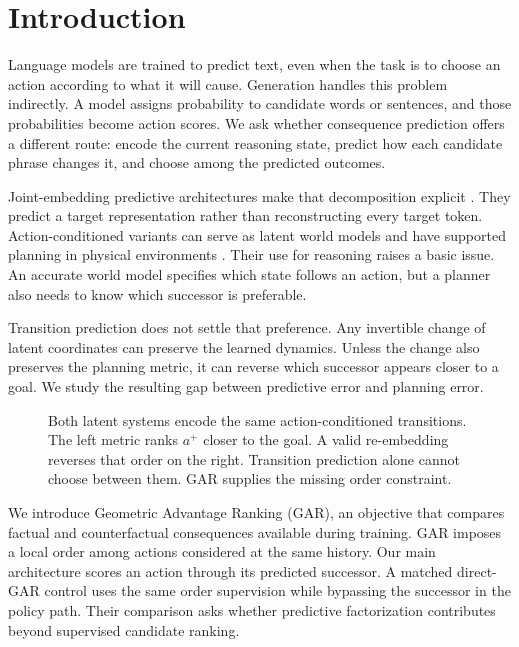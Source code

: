 \section{Introduction}

Language models are trained to predict text, even when the task is to choose an action according to what it will cause. Generation handles this problem indirectly. A model assigns probability to candidate words or sentences, and those probabilities become action scores. We ask whether consequence prediction offers a different route: encode the current reasoning state, predict how each candidate phrase changes it, and choose among the predicted outcomes.

Joint-embedding predictive architectures make that decomposition explicit \citep{lecun2022path,assran2023ijepa}. They predict a target representation rather than reconstructing every target token. Action-conditioned variants can serve as latent world models and have supported planning in physical environments \citep{assran2025vjepa2}. Their use for reasoning raises a basic issue. An accurate world model specifies which state follows an action, but a planner also needs to know which successor is preferable.

Transition prediction does not settle that preference. Any invertible change of latent coordinates can preserve the learned dynamics. Unless the change also preserves the planning metric, it can reverse which successor appears closer to a goal. We study the resulting gap between predictive error and planning error.

\begin{figure}[t]
    \centering
    \resizebox{0.82\linewidth}{!}{}
    \caption{Both latent systems encode the same action-conditioned transitions. The left metric ranks $a^+$ closer to the goal. A valid re-embedding reverses that order on the right. Transition prediction alone cannot choose between them. GAR supplies the missing order constraint.}
    \label{fig:nonidentifiability}
\end{figure}

We introduce Geometric Advantage Ranking (GAR), an objective that compares factual and counterfactual consequences available during training. GAR imposes a local order among actions considered at the same history. Our main architecture scores an action through its predicted successor. A matched direct-GAR control uses the same order supervision while bypassing the successor in the policy path. Their comparison asks whether predictive factorization contributes beyond supervised candidate ranking.

